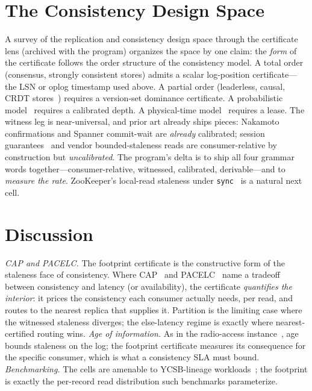 \documentclass[lettersize,onecolumn]{IEEEtran}
\theoremstyle{remark}
\begin{document}
\section{The Consistency Design Space}\label{sec:space}
A survey of the replication and consistency design space through the certificate
lens (archived with the program) organizes the space by one claim: the
\emph{form} of the certificate follows the order structure of the consistency
model. A total order (consensus, strongly consistent stores) admits a scalar
log-position certificate---the LSN or oplog timestamp used above. A partial order
(leaderless, causal, CRDT stores~\cite{shapiro2011crdt}) requires a version-set
dominance certificate. A probabilistic model~\cite{bailis2012pbs} requires a
calibrated depth. A physical-time model~\cite{corbett2012spanner} requires a
lease. The witness leg is near-universal, and prior art already ships pieces:
Nakamoto confirmations and Spanner commit-wait are \emph{already} calibrated;
session guarantees~\cite{terry1994session} and vendor bounded-staleness reads are
consumer-relative by construction but \emph{uncalibrated}. The program's delta is
to ship all four grammar words together---consumer-relative, witnessed,
calibrated, derivable---and to \emph{measure the rate}. ZooKeeper's local-read
staleness under \texttt{sync}~\cite{hunt2010zookeeper,junqueira2011zab} is a
natural next cell.

\section{Discussion}\label{sec:discussion}
\emph{CAP and PACELC.} The footprint certificate is the constructive form of the
staleness face of consistency. Where CAP~\cite{gilbert2002cap} and
PACELC~\cite{abadi2012pacelc} name a tradeoff between consistency and latency
(or availability), the certificate \emph{quantifies the interior}: it prices the
consistency each consumer actually needs, per read, and routes to the nearest
replica that supplies it. Partition is the limiting case where the witnessed
staleness diverges; the else-latency regime is exactly where nearest-certified
routing wins. \emph{Age of information.} As in the radio-access
instance~\cite{kaul2012aoi}, age bounds staleness on the log; the footprint
certificate measures its consequence for the specific consumer, which is what a
consistency SLA must bound. \emph{Benchmarking.} The cells are amenable to
YCSB-lineage workloads~\cite{cooper2010ycsb}; the footprint is exactly the
per-record read distribution such benchmarks parameterize.
\end{document}
